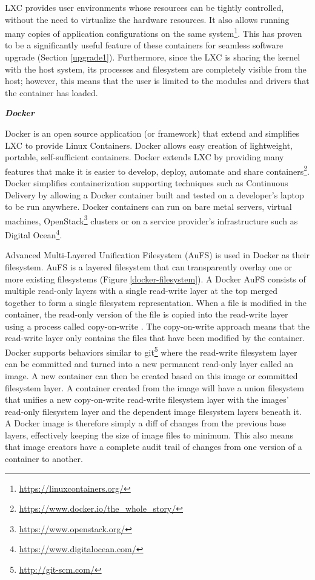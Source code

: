 \documentclass[a4paper,11pt,twoside]{report}
\begin{document}
LXC provides user environments whose resources can be tightly controlled, without the need to virtualize the hardware resources. It also allows running many copies of application configurations on the same system\footnote{\url{https://linuxcontainers.org/}}. This has proven to be a significantly useful feature of these containers for seamless software upgrade (Section \ref{upgrade1}). Furthermore, since the LXC is sharing the kernel with the host system, its processes and filesystem are completely visible from the host; however, this means that the user is limited to the modules and drivers that the container has loaded. \bigskip


\noindent
\textbf{\textit{Docker}}

\noindent
Docker is an open source application (or framework) that extend and simplifies LXC to provide Linux Containers. Docker allows easy creation of lightweight, portable, self-sufficient containers. Docker extends LXC by providing many features that make it is easier to develop, deploy, automate and share containers\footnote{\label{dockerB} \url{https://www.docker.io/the_whole_story/}}. Docker simplifies containerization supporting techniques such as Continuous Delivery by allowing a Docker container built and tested on a developer's laptop to be run anywhere. Docker containers can run on bare metal servers, virtual machines, OpenStack\footnote{\url{https://www.openstack.org/}} clusters or on a service provider's infrastructure such as Digital Ocean\footnote{\url{https://www.digitalocean.com/}}. 

Advanced Multi-Layered Unification Filesystem (AuFS) is used in Docker as their filesystem. AuFS is a layered filesystem that can transparently overlay one or more existing filesystems (Figure \ref{docker-filesystem}). A Docker AuFS consists of multiple read-only layers with a single read-write layer at the top merged together to form a single filesystem representation. When a file is modified in the container, the read-only version of the file is copied into the read-write layer using a process called copy-on-write \cite{docker2}. The copy-on-write approach means that the read-write layer only contains the files that have been modified by the container. Docker supports behaviors similar to git\footnote {\url{http://git-scm.com/}} where the read-write filesystem layer can be committed and turned into a new permanent read-only layer called an image. A new container can then be created based on this image or committed filesystem layer. A container created from the image will have a union filesystem that unifies a new copy-on-write read-write filesystem layer with the images' read-only filesystem layer and the dependent image filesystem layers beneath it. A Docker image is therefore simply a diff of changes from the previous base layers, effectively keeping the size of image files to minimum. This also means that image creators have a complete audit trail of changes from one version of a container to another. \bigskip
\end{document}
